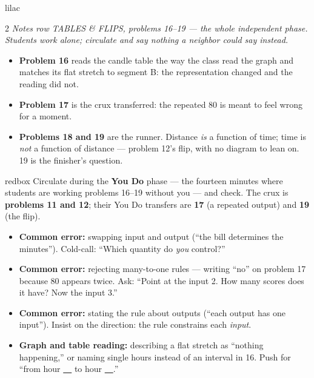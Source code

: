 \documentclass[10pt]{article}
\begin{document}
\begin{skillbox}{lilac}
\begin{multicols}{2}
\textit{Notes row TABLES \& FLIPS, problems 16--19 --- the whole independent phase.
Students work alone; circulate and say nothing a neighbor could say instead.}
\begin{itemize}
  \item \textbf{Problem 16} reads the candle table the way the class read the
        graph and matches its flat stretch to segment B: the representation
        changed and the reading did not.
  \item \textbf{Problem 17} is the crux transferred: the repeated 80 is meant to
        feel wrong for a moment.
  \item \textbf{Problems 18 and 19} are the runner. Distance \textit{is} a
        function of time; time is \textit{not} a function of distance ---
        problem 12's flip, with no diagram to lean on. 19 is the finisher's
        question.
\end{itemize}
\end{multicols}
\end{skillbox}

\boxguard
\begin{skillbox}{redbox}
Circulate during the \textbf{You Do} phase --- the fourteen minutes where students
are working problems 16--19 without you --- and check. The crux is
\textbf{problems 11 and 12}; their You Do transfers are \textbf{17} (a repeated
output) and \textbf{19} (the flip).
\begin{itemize}
  \item \textbf{Common error:} swapping input and output (``the bill determines the
        minutes''). Cold-call: ``Which quantity do \textit{you} control?''
  \item \textbf{Common error:} rejecting many-to-one rules --- writing ``no'' on
        problem 17 because 80 appears twice. Ask: ``Point at the input 2. How many
        scores does it have? Now the input 3.''
  \item \textbf{Common error:} stating the rule about outputs (``each output has
        one input''). Insist on the direction: the rule constrains each
        \textit{input}.
  \item \textbf{Graph and table reading:} describing a flat stretch as ``nothing
        happening,'' or naming single hours instead of an interval in 16. Push
        for ``from hour \underline{\ \ } to hour \underline{\ \ }.''
\end{itemize}
\end{skillbox}
\end{document}
